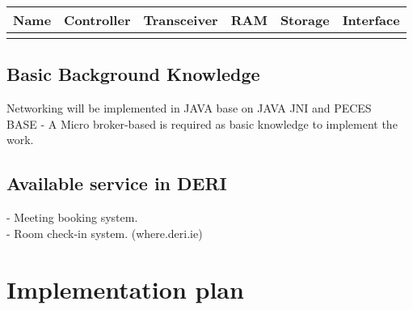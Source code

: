 \documentclass[a4paper]{llncs}
\newcommand{\head}[1]{\textnormal {\textbf{#1}}}
\begin{document}
\begin{tabular}{|p{2.5cm}|c|p{2cm}|c|c|c|}
\hline
\head{Name} & \head{Controller} & \head{Transceiver} & \head{RAM} & \head{Storage} &\head{Interface}\\
\hline
{} &{}&{}&{}&{}&{}\\
\hline
\end{tabular}

\subsection{Basic Background Knowledge}
Networking will be implemented in JAVA base on JAVA JNI and PECES\\
BASE - A Micro broker-based is required as basic knowledge to implement the work.

\subsection{Available service in DERI}
- Meeting booking system.\\
- Room check-in system. (where.deri.ie)



\section{Implementation plan}



\end{document}

